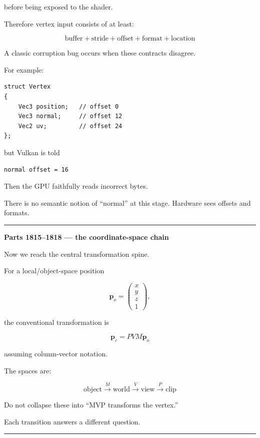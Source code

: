 before being exposed to the shader.

Therefore vertex input consists of at least:

\[
\boxed{\text{buffer}+\text{stride}+\text{offset}+\text{format}+\text{location}}
\]

A classic corruption bug occurs when these contracts disagree.

For example:

\begin{verbatim}
struct Vertex
{
    Vec3 position;   // offset 0
    Vec3 normal;     // offset 12
    Vec2 uv;         // offset 24
};
\end{verbatim}

but Vulkan is told

\begin{verbatim}
normal offset = 16
\end{verbatim}

Then the GPU faithfully reads incorrect bytes.

There is no semantic notion of ``normal'' at this stage. Hardware sees offsets and formats.

\begin{center}\rule{0.5\linewidth}{0.5pt}\end{center}

\textbf{Parts 1815--1818 --- the coordinate-space chain}

Now we reach the central transformation spine.

For a local/object-space position

\[
\mathbf p_o=
\begin{pmatrix}
x\\y\\z\\1
\end{pmatrix},
\]

the conventional transformation is

\[
\boxed{
\mathbf p_c
=
PVM\mathbf p_o
}
\]

assuming column-vector notation.

The spaces are:

\[
\boxed{
\text{object}
\xrightarrow{M}
\text{world}
\xrightarrow{V}
\text{view}
\xrightarrow{P}
\text{clip}
}
\]

Do not collapse these into ``MVP transforms the vertex.''

Each transition answers a different question.

\begin{center}\rule{0.5\linewidth}{0.5pt}\end{center}

